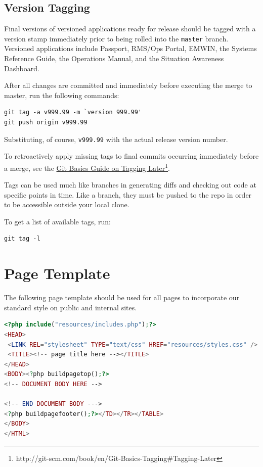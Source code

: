 \documentclass[pdflatex,letterpaper,twoside,12pt]{book}
\begin{document}
\subsection{Version Tagging}

Final versions of versioned applications ready for release should be tagged with a version stamp immediately prior to being rolled into the \texttt{master} branch.  Versioned applications include Passport, RMS/Ops Portal, EMWIN, the Systems Reference Guide, the Operations Manual, and the Situation Awareness Dashboard.

After all changes are committed and immediately before executing the merge to master, run the following commands:

\begin{lstlisting}
git tag -a v999.99 -m `version 999.99'
git push origin v999.99
\end{lstlisting}

Substituting, of course, \texttt{v999.99} with the actual release version number.

To retroactively apply missing tags to final commits occurring immediately before a merge, see the \href{http://git-scm.com/book/en/Git-Basics-Tagging#Tagging-Later}{Git Basics Guide on Tagging Later}\footnote{http://git-scm.com/book/en/Git-Basics-Tagging\#Tagging-Later}.

Tags can be used much like branches in generating diffs and checking out code at specific points in time.  Like a branch, they must be pushed to the repo in order to be accessible outside your local clone.

To get a list of available tags, run:

\begin{lstlisting}
git tag -l
\end{lstlisting}


\section{Page Template}

The following page template should be used for all pages to incorporate our standard style on public and internal sites.
\pagebreak

\begin{lstlisting}[language=PHP]
<?php include("resources/includes.php");?>
<HEAD>
 <LINK REL="stylesheet" TYPE="text/css" HREF="resources/styles.css" />
 <TITLE><!-- page title here --></TITLE>
</HEAD>
<BODY><?php buildpagetop();?>
<!-- DOCUMENT BODY HERE -->

<!-- END DOCUMENT BODY --->
<?php buildpagefooter();?></TD></TR></TABLE>
</BODY>
</HTML>
\end{lstlisting}
\end{document}
